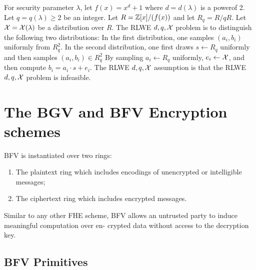 \begin{defn}
  For security parameter $\lambda$, let $f(x)=x^d+1$ where $d=d(\lambda)$ is a powerof 2.
  Let $q=q(\lambda)\geq 2$ be an integer. 
  Let $R = \mathbb{Z}[x]/(f(x))$ and let $R_q = R/qR$. 
  Let $\mathcal{X} = \mathcal{X}(\lambda)$ be a distribution over $R$.
  The RLWE $d,q,\mathcal{X}$ problem is to distinguish the following two distributions:
  In the first distribution, one samples $(a_i,b_i)$ uniformly from $R_q^2$.
  In the second distribution,
  one first draws $s\leftarrow R_q$ uniformly and then samples $(a_i,b_i)\in R_q^2$
  By sampling $a_i\leftarrow R_q$ uniformly, $e_i \leftarrow \mathcal{X}$,
  and then compute $b_i=a_i\cdot s +e_i$.
  The RLWE $d,q,\mathcal{X}$ assumption is that the RLWE $d,q,\mathcal{X}$ problem is infeasible.
\end{defn}


\section{The BGV and BFV Encryption schemes}
BFV is instantiated over two rings:
\begin{enumerate}
\item The plaintext ring which includes encodings of unencrypted or intelligible
messages;
\item The ciphertext ring which includes encrypted messages.
\end{enumerate}
Similar to any other FHE scheme, BFV allows an untrusted party to
induce meaningful computation over en- crypted data without access
to the decryption key.

\subsection{BFV Primitives}

